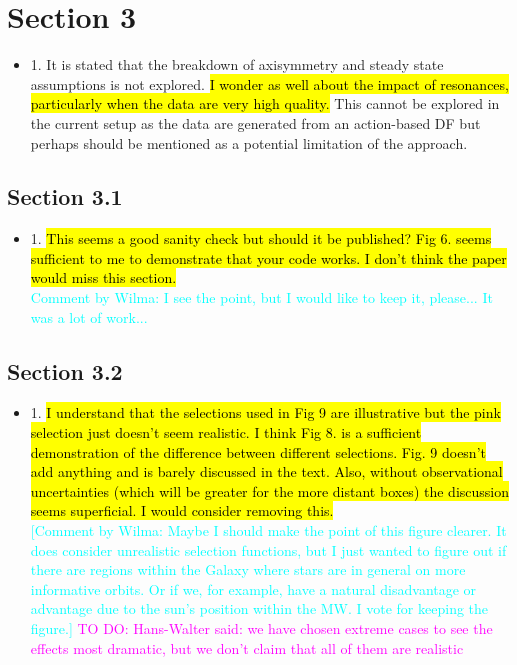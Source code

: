 \documentclass[10pt,a4paper]{article}
\newcommand{\Wilma}[1]{\textcolor{Magenta}{#1}}
\newcommand{\HW}[1]{\textcolor{Cyan}{#1}}
\begin{document}
\section{Section 3}
\begin{itemize}
\item 1. It is stated that the breakdown of axisymmetry and steady state assumptions is not explored. \hl{I wonder as well about the impact of resonances, particularly when the data are very high quality.} This cannot be explored in the current setup as the data are generated from an action-based DF but perhaps should be mentioned as a potential limitation of the approach.
\end{itemize}


\subsection{Section 3.1}
\begin{itemize}
\item 1. \hl{This seems a good sanity check but should it be published? Fig 6. seems sufficient to me to demonstrate that your code works. I don't think the paper would miss this section.}\\\HW{Comment by Wilma: I see the point, but I would like to keep it, please... It was a lot of work...}
\end{itemize}


\subsection{Section 3.2}
\begin{itemize}
\item 1. \hl{I understand that the selections used in Fig 9 are illustrative but the pink selection just doesn't seem realistic. I think Fig 8. is a sufficient demonstration of the difference between different selections. Fig. 9 doesn't add anything and is barely discussed in the text. Also, without observational uncertainties (which will be greater for the more distant boxes) the discussion seems superficial. I would consider removing this.}\\
\HW{[Comment by Wilma: Maybe I should make the point of this figure clearer. It does consider unrealistic selection functions, but I just wanted to figure out if there are regions within the Galaxy where stars are in general on more informative orbits. Or if we, for example, have a natural disadvantage or advantage due to the sun's position within the MW. I vote for keeping the figure.] \Wilma{TO DO: Hans-Walter said: we have chosen extreme cases to see the effects most dramatic, but we don't claim that all of them are realistic}}
\end{itemize}
\end{document}
